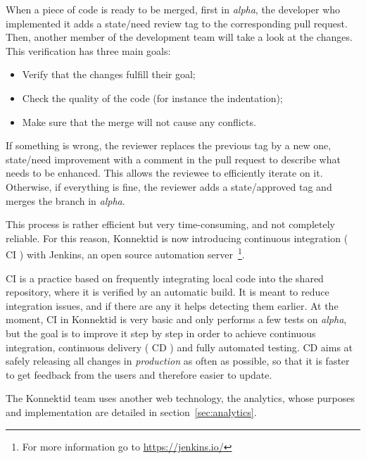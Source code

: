 When a piece of code is ready to be merged, first in \textit{alpha}, the developer who implemented it adds a \guillemotleft{} state/need review \guillemotright{} tag to the corresponding pull request. Then, another member of the development team will take a look at the changes. This verification has three main goals:

\begin{itemize}[noitemsep]
	\item Verify that the changes fulfill their goal;
 	\item Check the quality of the code (for instance the indentation);
	\item Make sure that the merge will not cause any conflicts.
\end{itemize}

If something is wrong, the reviewer replaces the previous tag by a new one, \guillemotleft{} state/need improvement \guillemotright{} with a comment in the pull request to describe what needs to be enhanced. This allows the reviewee to efficiently iterate on it. Otherwise, if everything is fine, the reviewer adds a \guillemotleft{} state/approved \guillemotright{} tag and merges the branch in \textit{alpha}.

This process is rather efficient but very time-consuming, and not completely reliable. For this reason, Konnektid is now introducing continuous integration (\guillemotleft{} CI \guillemotright{}) with Jenkins, an open source automation server~\footnote{For more information go to \url{https://jenkins.io/}}. 

CI is a practice based on frequently integrating local code into the shared repository, where it is verified by an automatic build. It is meant to reduce integration issues, and if there are any it helps detecting them earlier. At the moment, CI in Konnektid is very basic and only performs a few tests on \textit{alpha}, but the goal is to improve it step by step in order to achieve continuous integration, continuous delivery (\guillemotleft{} CD \guillemotright{}) and fully automated testing. CD aims at safely releasing all changes in \textit{production} as often as possible, so that it is faster to get feedback from the users and therefore easier to update.

The Konnektid team uses another web technology, the analytics, whose purposes and implementation are detailed in {\sc section}~\ref{sec:analytics}.